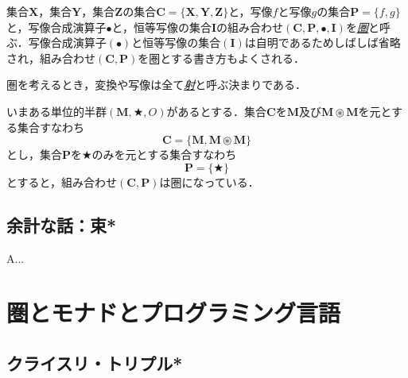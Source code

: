 \documentclass[a4paper]{jsbook}
\newcommand{\keyword}[1]{{\underline{\emph{#1}}}}
\newcommand{\mathSet}[1]{\mathbf{#1}} %
\newcommand{\mathAnyBinaryOperator}{\mathbin{\bigstar}}
\newcommand{\mathCompose}{\mathbin{\bullet}}
\newcommand{\mathSetTimes}{\mathbin{\circledast}}
\newcommand{\mathCategoryShort}[2]{(#1,#2)}
\newcommand{\mathMonoid}[3]{(#1,#2,#3)}
\newcommand{\mathCategory}[4]{(#1,#2,#3,#4)}
\begin{document}
集合$\mathSet{X}$，集合$\mathSet{Y}$，集合$\mathSet{Z}$の集合$\mathSet{C}=\{\mathSet{X},\mathSet{Y},\mathSet{Z}\}$と，写像$f$と写像$g$の集合$\mathSet{P}=\{f,g\}$と，写像合成演算子$\mathCompose$と，恒等写像の集合$\mathSet{I}$の組み合わせ$\mathCategory{\mathSet{C}}{\mathSet{P}}{\mathCompose}{\mathSet{I}}$を\keyword{圏}と呼ぶ．写像合成演算子$(\mathCompose)$と恒等写像の集合$(\mathSet{I})$は自明であるためしばしば省略され，組み合わせ$\mathCategoryShort{\mathSet{C}}{\mathSet{P}}$を圏とする書き方もよくされる．

圏を考えるとき，変換や写像は全て\keyword{射}と呼ぶ決まりである．

いまある単位的半群$\mathMonoid{\mathSet{M}}{\mathAnyBinaryOperator}{O}$があるとする．集合$\mathSet{C}$を$\mathSet{M}$及び$\mathSet{M}\mathSetTimes\mathSet{M}$を元とする集合すなわち
\begin{equation}
\mathSet{C}=\{\mathSet{M},\mathSet{M}\mathSetTimes\mathSet{M}\}
\end{equation}
とし，集合$\mathSet{P}$を$\mathAnyBinaryOperator$のみを元とする集合すなわち
\begin{equation}
\mathSet{P}=\{\mathAnyBinaryOperator\}
\end{equation}
とすると，組み合わせ$\mathCategoryShort{\mathSet{C}}{\mathSet{P}}$は圏になっている．

\section{余計な話：束*}

A...


\chapter{圏とモナドとプログラミング言語}


\section{クライスリ・トリプル*}
\end{document}
